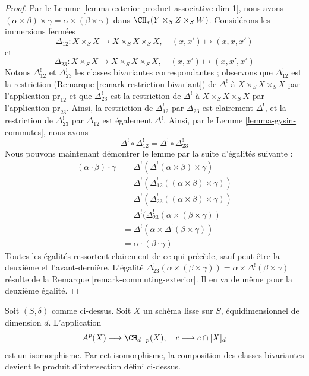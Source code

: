 \begin{proof}
Par le Lemme \ref{lemma-exterior-product-associative-dim-1}, nous avons
$(\alpha \times \beta) \times \gamma =
\alpha \times (\beta \times \gamma)$ dans $\CH_*(Y \times_S Z \times_S W)$.
Considérons les immersions fermées
$$
\Delta_{12} : X \times_S X \longrightarrow X \times_S X \times_S X,
\quad (x, x') \mapsto (x, x, x')
$$
et
$$
\Delta_{23} : X \times_S X \longrightarrow X \times_S X \times_S X,
\quad (x, x') \mapsto (x, x', x')
$$
Notons $\Delta_{12}^!$ et $\Delta_{23}^!$ les classes bivariantes
correspondantes ; observons que $\Delta_{12}^!$ est la restriction
(Remarque \ref{remark-restriction-bivariant}) de $\Delta^!$
à $X \times_S X \times_S X$ par l'application $\text{pr}_{12}$ et que
$\Delta_{23}^!$ est la restriction de $\Delta^!$
à $X \times_S X \times_S X$ par l'application $\text{pr}_{23}$.
Ainsi, la restriction de $\Delta_{12}^!$ par $\Delta_{23}$
est clairement $\Delta^!$, et la restriction de $\Delta_{23}^!$ par $\Delta_{12}$ est
également $\Delta^!$. Ainsi, par le Lemme \ref{lemma-gysin-commutes}, nous avons
$$
\Delta^! \circ \Delta_{12}^! =
\Delta^! \circ \Delta_{23}^! 
$$
Nous pouvons maintenant démontrer le lemme par la suite d'égalités suivante :
\begin{align*}
(\alpha \cdot \beta) \cdot \gamma
& =
\Delta^!(\Delta^!(\alpha \times \beta) \times \gamma) \\
& =
\Delta^!(\Delta_{12}^!((\alpha \times \beta) \times \gamma)) \\
& =
\Delta^!(\Delta_{23}^!((\alpha \times \beta) \times \gamma)) \\
& =
\Delta^!(\Delta_{23}^!(\alpha \times (\beta \times \gamma)) \\
& =
\Delta^!(\alpha \times \Delta^!(\beta \times \gamma)) \\
& =
\alpha \cdot (\beta \cdot \gamma)
\end{align*}
Toutes les égalités ressortent clairement de ce qui précède, sauf peut-être
la deuxième et l'avant-dernière. L'égalité
$\Delta_{23}^!(\alpha \times (\beta \times \gamma)) =
\alpha \times \Delta^!(\beta \times \gamma)$ résulte de la
Remarque \ref{remark-commuting-exterior}. Il en va de même pour la deuxième
égalité.
\end{proof}

\begin{lemma}
\label{lemma-identify-chow-for-smooth-dim-1}
Soit $(S, \delta)$ comme ci-dessus. Soit $X$ un schéma lisse sur $S$,
équidimensionnel de dimension $d$. L'application
$$
A^p(X) \longrightarrow \CH_{d - p}(X),\quad
c \longmapsto c \cap [X]_d
$$
est un isomorphisme. Par cet isomorphisme, la composition des classes
bivariantes devient le produit d'intersection défini ci-dessus.
\end{lemma}

